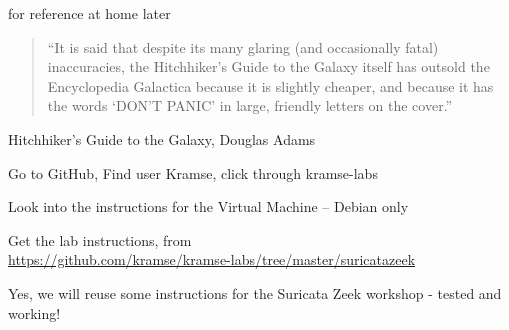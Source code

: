 \documentclass[Screen16to9,17pt]{foils}
\begin{document}
for reference at home later




\begin{quote}
“It is said that despite its many glaring (and occasionally fatal) inaccuracies, the Hitchhiker’s Guide to the Galaxy itself has outsold the Encyclopedia Galactica because it is slightly cheaper, and because it has the words ‘DON’T PANIC’ in large, friendly letters on the cover.”
\end{quote}
Hitchhiker’s Guide to the Galaxy, Douglas Adams


\begin{list2}
\item Go to GitHub, Find user Kramse, click through kramse-labs
\item Look into the instructions for the Virtual Machine -- Debian only

\item Get the lab instructions, from\\ {\footnotesize\url{https://github.com/kramse/kramse-labs/tree/master/suricatazeek}}
\end{list2}

Yes, we will reuse some instructions for the Suricata Zeek workshop - tested and working!





\end{document}
